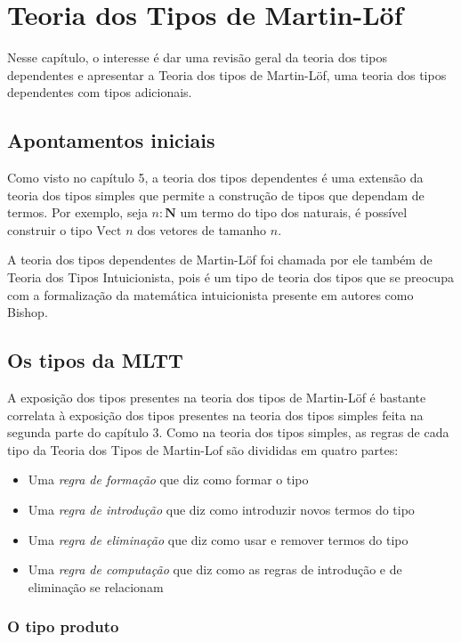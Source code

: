 \documentclass[../main.tex]{subfiles}
\begin{document}
\section{Teoria dos Tipos de Martin-Löf}

Nesse capítulo, o interesse é dar uma revisão geral da teoria dos tipos dependentes e apresentar a Teoria dos tipos de Martin-Löf, uma teoria dos tipos dependentes com tipos adicionais. 

\subsection{Apontamentos iniciais}

Como visto no capítulo 5, a teoria dos tipos dependentes é uma extensão da teoria dos tipos simples que permite a construção de tipos que dependam de termos. Por exemplo, seja $n : \mathbf{N}$ um termo do tipo dos naturais, é possível construir o tipo $\text{Vect } n$ dos vetores de tamanho $n$.

A teoria dos tipos dependentes de Martin-Löf foi chamada por ele também de Teoria dos Tipos Intuicionista, pois é um tipo de teoria dos tipos que se preocupa com a formalização da matemática intuicionista presente em autores como Bishop.

\subsection{Os tipos da MLTT}

A exposição dos tipos presentes na teoria dos tipos de Martin-Löf é bastante correlata à exposição dos tipos presentes na teoria dos tipos simples feita na segunda parte do capítulo 3. Como na teoria dos tipos simples, as regras de cada tipo da Teoria dos Tipos de Martin-Lof são divididas em quatro partes: 

\begin{itemize}
    \item Uma \emph{regra de formação} que diz como formar o tipo
    \item Uma \emph{regra de introdução} que diz como introduzir novos termos do tipo
    \item Uma \emph{regra de eliminação} que diz como usar e remover termos do tipo
    \item Uma \emph{regra de computação} que diz como as regras de introdução e de eliminação se relacionam
\end{itemize}

\subsubsection*{O tipo produto}
\end{document}
